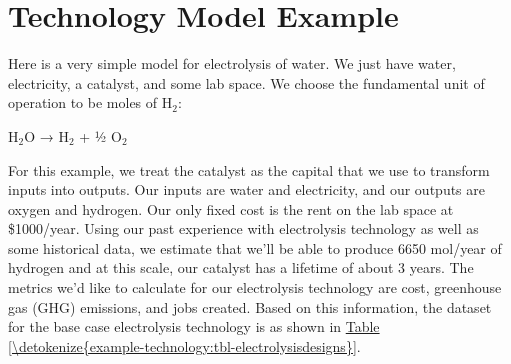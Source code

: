 \documentclass[letterpaper,10pt,english]{sphinxmanual}
\begin{document}
\sphinxstepscope


\chapter{Technology Model Example}
\label{\detokenize{example-technology:technology-model-example}}\label{\detokenize{example-technology:sec-techmodelexample}}\label{\detokenize{example-technology::doc}}
\sphinxAtStartPar
Here is a very simple model for electrolysis of water. We just have water, electricity, a catalyst, and some lab space. We choose the fundamental unit of operation to be moles of H$_{\text{2}}$:

\sphinxAtStartPar
H$_{\text{2}}$O → H$_{\text{2}}$ + ½ O$_{\text{2}}$

\sphinxAtStartPar
For this example, we treat the catalyst as the capital that we use to transform inputs into outputs. Our inputs are water and electricity, and our outputs are oxygen and hydrogen. Our only fixed cost is the rent on the lab space at \$1000/year. Using our past experience with electrolysis technology as well as some historical data, we estimate that we’ll be able to produce 6650 mol/year of hydrogen and at this scale, our catalyst has a lifetime of about 3 years. The metrics we’d like to calculate for our electrolysis technology are cost, greenhouse gas (GHG) emissions, and jobs created. Based on this information, the  dataset for the base case electrolysis technology is as shown in \hyperref[\detokenize{example-technology:tbl-electrolysisdesigns}]{Table \ref{\detokenize{example-technology:tbl-electrolysisdesigns}}}.
\end{document}
